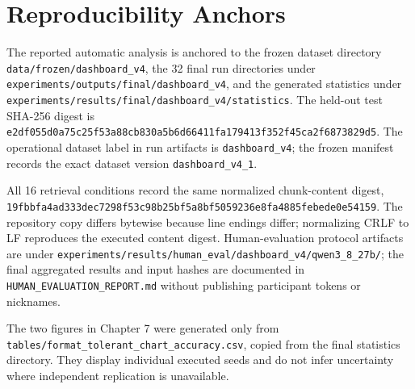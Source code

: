 \chapter{Reproducibility Anchors}
\label{app:reproducibility-anchors}

The reported automatic analysis is anchored to the frozen dataset directory \nolinkurl{data/frozen/dashboard_v4}, the 32 final run directories under \nolinkurl{experiments/outputs/final/dashboard_v4}, and the generated statistics under \nolinkurl{experiments/results/final/dashboard_v4/statistics}. The held-out test SHA-256 digest is \nolinkurl{e2df055d0a75c25f53a88cb830a5b6d66411fa179413f352f45ca2f6873829d5}. The operational dataset label in run artifacts is \texttt{dashboard\_v4}; the frozen manifest records the exact dataset version \texttt{dashboard\_v4\_1}.

All 16 retrieval conditions record the same normalized chunk-content digest, \nolinkurl{19fbbfa4ad333dec7298f53c98b25bf5a8bf5059236e8fa4885febede0e54159}. The repository copy differs bytewise because line endings differ; normalizing CRLF to LF reproduces the executed content digest. Human-evaluation protocol artifacts are under \nolinkurl{experiments/results/human_eval/dashboard_v4/qwen3_8_27b/}; the final aggregated results and input hashes are documented in \texttt{HUMAN\_EVALUATION\_REPORT.md} without publishing participant tokens or nicknames.

The two figures in Chapter 7 were generated only from \nolinkurl{tables/format_tolerant_chart_accuracy.csv}, copied from the final statistics directory. They display individual executed seeds and do not infer uncertainty where independent replication is unavailable.

